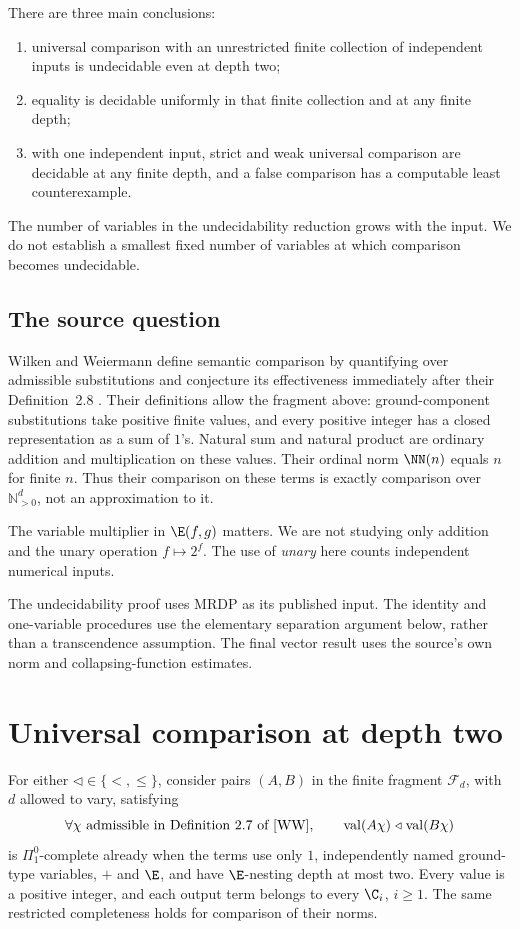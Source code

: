 \documentclass[11pt]{article}
\begin{document}
There are three main conclusions:
\begin{enumerate}
\item universal comparison with an unrestricted finite collection of
independent inputs is undecidable even at depth two;
\item equality is decidable uniformly in that finite collection and
at any finite depth;
\item with one independent input, strict and weak universal comparison
are decidable at any finite depth, and a false comparison has a
computable least counterexample.
\end{enumerate}
The number of variables in the undecidability reduction grows with the
input. We do not establish a smallest fixed number of variables at which
comparison becomes undecidable.

\subsection{The source question}
Wilken and Weiermann define semantic comparison by quantifying over
admissible substitutions and conjecture its effectiveness immediately
after their Definition~2.8 \cite{WW}. Their definitions allow the fragment
above: ground-component substitutions take positive finite values, and
every positive integer has a closed representation as a sum of $1$'s.
Natural sum and natural product are ordinary addition and multiplication
on these values. Their ordinal norm $\NN(n)$ equals $n$ for finite $n$.
Thus their comparison on these terms is exactly comparison over
$\mathbb N_{>0}^d$, not an approximation to it.

The variable multiplier in $\E(f,g)$ matters. We are not studying only
addition and the unary operation $f\mapsto2^f$. The use of \emph{unary}
here counts independent numerical inputs.

The undecidability proof uses MRDP as its published input. The identity
and one-variable procedures use the elementary separation argument below,
rather than a transcendence assumption. The final vector result uses
the source's own norm and collapsing-function estimates.

\section{Universal comparison at depth two}
\begin{theorem}
\label{thm:finite-bare-hardness}
For either $\triangleleft\in\{<,\le\}$, consider pairs $(A,B)$ in the
finite fragment $\mathcal F_d$, with $d$ allowed to vary, satisfying
\[
 \forall\chi\text{ admissible in Definition~2.7 of \cite{WW}},\qquad
 \operatorname{val}(A\chi)\mathrel{\triangleleft}
 \operatorname{val}(B\chi)
\]
is $\Pi^0_1$-complete already when the terms use only $1$, independently
named ground-type variables, $+$ and $\E$, and have $\E$-nesting depth
at most two. Every value is a positive integer, and each output term
belongs to every $\C_i$, $i\ge1$. The same restricted completeness
holds for comparison of their norms.
\end{theorem}
\end{document}
